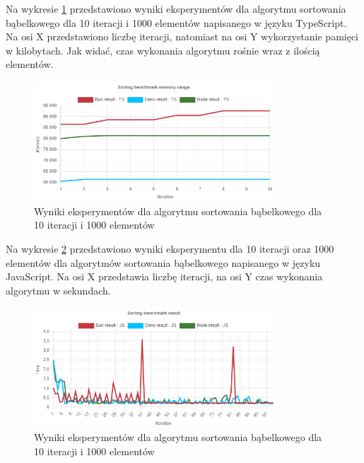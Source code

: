 Na wykresie \ref{fig:quick_sorting_e1_memory_ts} przedstawiono wyniki eksperymentów dla algorytmu sortowania bąbelkowego dla 10 iteracji i 1000 elementów napisanego w języku TypeScript. Na osi X przedstawiono liczbę iteracji, natomiast na osi Y wykorzystanie pamięci w kilobytach. Jak widać, czas wykonania algorytmu rośnie wraz z ilością elementów.
\begin{figure}[H]
  \centering
  \includegraphics[width=0.8\textwidth]{Figures/sorting/quick/e1_memory_ts.png}
  \caption{Wyniki eksperymentów dla algorytmu sortowania bąbelkowego dla 10 iteracji i 1000 elementów}
  \label{fig:quick_sorting_e1_memory_ts}
\end{figure}

Na wykresie \ref{fig:quick_sorting_e2} przedstawiono wyniki eksperymentu dla 10 iteracji oraz 1000 elementów dla algorytmów sortowania bąbelkowego napisanego w języku JavaScript. Na osi X przedstawia liczbę iteracji, na osi Y czas wykonania algorytmu w sekundach. 

\begin{figure}[H]
  \centering
  \includegraphics[width=0.8\textwidth]{Figures/sorting/quick/e2_js.png}
  \caption{Wyniki eksperymentów dla algorytmu sortowania bąbelkowego dla 10 iteracji i 1000 elementów}
  \label{fig:quick_sorting_e2}
\end{figure}

